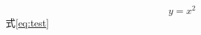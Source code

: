 \documentclass[uplatex, 11pt, a4j, dvipdfmx]{jsarticle}
\begin{document}
\begin{equation}
\label{eq:test}
y = x^2
\end{equation}
\newpage
式\eqref{eq:test}
\end{document}
